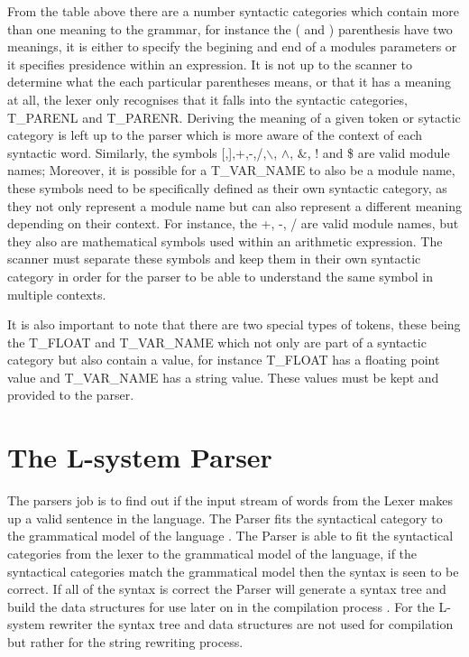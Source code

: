 \noindent
From the table above there are a number syntactic categories which contain more than one meaning to the grammar, for instance the ( and ) parenthesis have two meanings, it is either to specify the begining and end of a modules parameters or it specifies presidence within an expression.  It is not up to the scanner to determine what the each particular parentheses means, or that it has a meaning at all, the lexer only recognises that it falls into the syntactic categories, T\_PARENL and T\_PARENR. Deriving the meaning of a given token or sytactic category is left up to the parser which is more aware of the context of each syntactic word. Similarly, the symbols [,],+,-,/,$\backslash$, $\land$, $\&$, ! and \$ are valid module names; Moreover, it is possible for a T\_VAR\_NAME to also be a module name, these symbols need to be specifically defined as their own syntactic category, as they not only represent a module name but can also represent a different meaning depending on their context. For instance, the +, -, / are valid module names, but they also are mathematical symbols used within an arithmetic expression. The scanner must separate these symbols and keep them in their own syntactic category in order for the parser to be able to understand the same symbol in multiple contexts. 


It is also important to note that there are two special types of tokens, these being the T\_FLOAT and T\_VAR\_NAME which not only are part of a syntactic category but also contain a value, for instance T\_FLOAT has a floating point value and T\_VAR\_NAME has a string value. These values must be kept and provided to the parser.

\section{The L-system Parser} \label{parser}

The parsers job is to find out if the input stream of words from the \gls{Lexer} makes up a valid sentence in the language. The \gls{Parser} fits the syntactical category to the grammatical model of the language . The \gls{Parser} is able to fit the syntactical categories from the lexer to the grammatical model of the language, if the syntactical categories match the grammatical model then the syntax is seen to be correct. If all of the syntax is correct the \gls{Parser} will generate a syntax tree and build the data structures for use later on in the compilation process \cite{cooper2011engineering}. For the L-system rewriter the syntax tree and data structures are not used for compilation but rather for the string rewriting process. 

